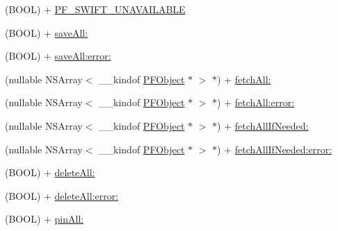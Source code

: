 \begin{DoxyCompactItemize}
\begin{DoxyCompactList}
 \end{DoxyCompactList}\item 
(B\+O\+O\+L) + \hyperlink{interface_p_f_object_adbd353cd498462b7749c7a2ad0d745d0}{P\+F\+\_\+\+S\+W\+I\+F\+T\+\_\+\+U\+N\+A\+V\+A\+I\+L\+A\+B\+L\+E}
\begin{DoxyCompactList}\small\item\em 

 \end{DoxyCompactList}\item 
(B\+O\+O\+L) + \hyperlink{interface_p_f_object_a45a04d0a783889f890434154bf5f149d}{save\+All\+:}
\begin{DoxyCompactList}\small\item\em 

 \end{DoxyCompactList}\item 
(B\+O\+O\+L) + \hyperlink{interface_p_f_object_a64b68e7023d616fc5cc0cdc37e25d66b}{save\+All\+:error\+:}
\item 
(nullable N\+S\+Array$<$ \+\_\+\+\_\+kindof \hyperlink{interface_p_f_object}{P\+F\+Object} $\ast$ $>$ $\ast$) + \hyperlink{interface_p_f_object_a83e6e6f31ca6224af347031b33a12a75}{fetch\+All\+:}
\begin{DoxyCompactList}\small\item\em 

 \end{DoxyCompactList}\item 
(nullable N\+S\+Array$<$ \+\_\+\+\_\+kindof \hyperlink{interface_p_f_object}{P\+F\+Object} $\ast$ $>$ $\ast$) + \hyperlink{interface_p_f_object_a7daada97128520bf652b1da73c031df0}{fetch\+All\+:error\+:}
\item 
(nullable N\+S\+Array$<$ \+\_\+\+\_\+kindof \hyperlink{interface_p_f_object}{P\+F\+Object} $\ast$ $>$ $\ast$) + \hyperlink{interface_p_f_object_a81f20598cd4749c05acce059bcc5af08}{fetch\+All\+If\+Needed\+:}
\item 
(nullable N\+S\+Array$<$ \+\_\+\+\_\+kindof \hyperlink{interface_p_f_object}{P\+F\+Object} $\ast$ $>$ $\ast$) + \hyperlink{interface_p_f_object_a4f0fdf00836ff3fa9b7d6926fbcb979c}{fetch\+All\+If\+Needed\+:error\+:}
\item 
(B\+O\+O\+L) + \hyperlink{interface_p_f_object_aac06376435a76790f2fe993f58c0718b}{delete\+All\+:}
\begin{DoxyCompactList}\small\item\em 

 \end{DoxyCompactList}\item 
(B\+O\+O\+L) + \hyperlink{interface_p_f_object_aa0085ed621b498db0df72e0299f0793b}{delete\+All\+:error\+:}
\item 
(B\+O\+O\+L) + \hyperlink{interface_p_f_object_adf5ab1c60be9510588749f46d6639f63}{pin\+All\+:}
\begin{DoxyCompactList}\small\item\em 


\end{DoxyCompactList}
\end{DoxyCompactItemize}
